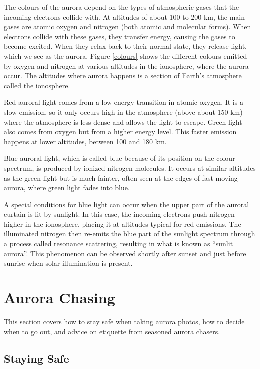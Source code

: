 \documentclass{article}
\newcommand{\contributed}[1]{%
    \par\noindent
    \begingroup
    \setlength{\leftskip}{1em}%
    \itshape
    Contributors: #1
    \par
    \endgroup
    \vspace{0.5em}
}
\begin{document}
The colours of the aurora depend on the types of atmospheric gases that the incoming electrons collide with. At altitudes of about 100 to 200 km, the main gases are atomic oxygen and nitrogen (both atomic and molecular forms). When electrons collide with these gases, they transfer energy, causing the gases to become excited. When they relax back to their normal state, they release light, which we see as the aurora. Figure \ref{colours} shows the different colours emitted by oxygen and nitrogen at various altitudes in the ionosphere, where the aurora occur. The altitudes where aurora happens is a section of Earth's atmosphere called the ionosphere.


Red auroral light comes from a low-energy transition in atomic oxygen. It is a slow emission, so it only occurs high in the atmosphere (above about 150 km) where the atmosphere is less dense and allows the light to escape. Green light also comes from oxygen but from a higher energy level. This faster emission happens at lower altitudes, between 100 and 180 km.


Blue auroral light, which is called blue because of its position on the colour spectrum, is produced by ionized nitrogen molecules. It occurs at similar altitudes as the green light but is much fainter, often seen at the edges of fast-moving aurora, where green light fades into blue. 


A special conditions for blue light can occur when the upper part of the auroral curtain is lit by sunlight. In this case, the incoming electrons push nitrogen higher in the ionosphere, placing it at altitudes typical for red emissions. The illuminated nitrogen then re-emits the blue part of the sunlight spectrum through a process called resonance scattering, resulting in what is known as ``sunlit aurora''. This phenomenon can be observed shortly after sunset and just before sunrise when solar illumination is present.


\section{Aurora Chasing}
This section covers how to stay safe when taking aurora photos, how to decide when to go out, and advice on etiquette from seasoned aurora chasers.

\subsection{Staying Safe}
\end{document}
